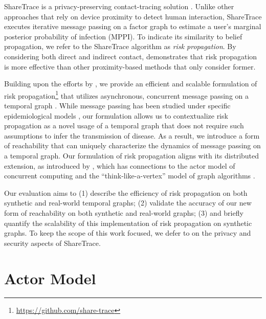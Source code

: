 ShareTrace is a privacy-preserving contact-tracing solution \cite{Ayday2021}.
Unlike other approaches that rely on device proximity to detect human
interaction, ShareTrace executes iterative message passing on a factor graph to
estimate a user's marginal posterior probability of infection (MPPI). To
indicate its similarity to belief propagation, we refer to the ShareTrace
algorithm as \emph{risk propagation}. By considering both direct and indirect
contact, \cite{Ayday2021} demonstrates that risk propagation is more effective
than other proximity-based methods that only consider former.

Building upon the efforts by \cite{Ayday2021}, we provide an efficient and
scalable formulation of risk
propagation\footnote{\url{https://github.com/share-trace}} that utilizes
asynchronous, concurrent message passing on a temporal graph \cite{Holme2012,
Holme2015}. While message passing has been studied under specific
epidemiological models \cite{Karrer2010, Li2021}, our formulation allows us to
contextualize risk propagation as a novel usage of a temporal graph that does
not require such assumptions to infer the transmission of disease. As a result,
we introduce a form of reachability that can uniquely characterize the dynamics
of message passing on a temporal graph. Our formulation of risk propagation
aligns with its distributed extension, as introduced by \cite{Ayday2021}, which
has connections to the actor model of concurrent computing \cite{Baker1977,
Agha1986} and the ``think-like-a-vertex'' model of graph algorithms
\cite{McCune2015}.

Our evaluation aims to (1) describe the efficiency of risk propagation on both
synthetic and real-world temporal graphs; (2) validate the accuracy of our new
form of reachability on both synthetic and real-world graphs; (3) and briefly
quantify the scalability of this implementation of risk propagation on
synthetic graphs. To keep the scope of this work focused, we defer to
\cite{Ayday2021} on the privacy and security aspects of ShareTrace.

\section{Actor Model}
